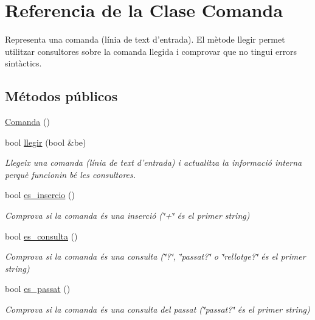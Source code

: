 \hypertarget{class_comanda}{\section{Referencia de la Clase Comanda}
\label{class_comanda}
}


Representa una comanda (línia de text d'entrada). El mètode llegir permet utilitzar consultores sobre la comanda llegida i comprovar que no tingui errors sintàctics.  


\subsection*{Métodos públicos}
\begin{DoxyCompactItemize}
\item 
\hyperlink{class_comanda_a0f09e7aa5b7c15f131020d04bf5a8a94}{Comanda} ()
\item 
bool \hyperlink{class_comanda_af2dbc8ccdbb94bed6ea26155edc71b57}{llegir} (bool \&be)
\begin{DoxyCompactList}\small\item\em Llegeix una comanda (línia de text d'entrada) i actualitza la informació interna perquè funcionin bé les consultores. \end{DoxyCompactList}\item 
bool \hyperlink{class_comanda_a614467bedacc9cf29cc5a9dcbba6b23d}{es\-\_\-insercio} ()
\begin{DoxyCompactList}\small\item\em Comprova si la comanda és una inserció (\char`\"{}+\char`\"{} és el primer string) \end{DoxyCompactList}\item 
bool \hyperlink{class_comanda_a847ee227fd7fea3a105dbd78735de453}{es\-\_\-consulta} ()
\begin{DoxyCompactList}\small\item\em Comprova si la comanda és una consulta (\char`\"{}?\char`\"{}, \char`\"{}passat?\char`\"{} o \char`\"{}rellotge?\char`\"{} és el primer string) \end{DoxyCompactList}\item 
bool \hyperlink{class_comanda_a1f435f8b605f0d1f5cbb06c8c6fe4005}{es\-\_\-passat} ()
\begin{DoxyCompactList}\small\item\em Comprova si la comanda és una consulta del passat (\char`\"{}passat?\char`\"{} és el primer string) \end{DoxyCompactList}\item 

\end{DoxyCompactItemize}
